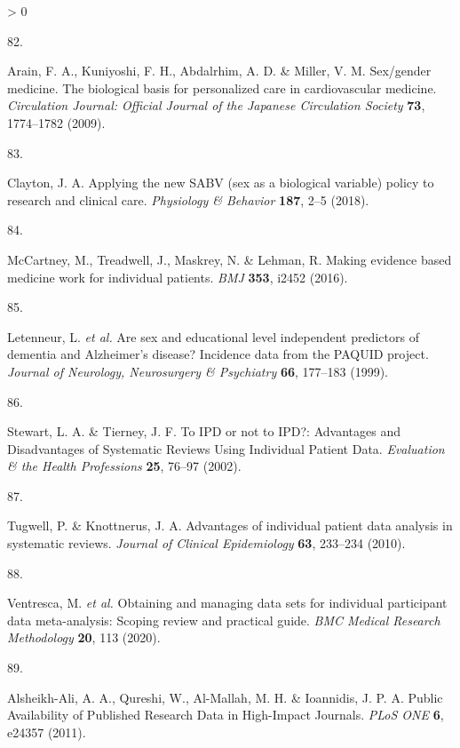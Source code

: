 \documentclass[a4paper, twoside]{templates/ociamthesis}
\newlength{\cslhangindent}
\newlength{\csllabelwidth}
\newenvironment{CSLReferences}[3] %
 {%
  \setlength{\parindent}{0pt}
  \ifodd #1 \everypar{\setlength{\hangindent}{\cslhangindent}}\ignorespaces\fi
  \ifnum #2 > 0
  \setlength{\parskip}{#2\baselineskip}
  \fi
 }%
 {}
\newcommand{\CSLLeftMargin}[1]{\parbox[t]{\maxof{\widthof{#1}}{\csllabelwidth}}{#1}}
\newcommand{\CSLRightInline}[1]{\parbox[t]{\linewidth - \csllabelwidth}{#1}}
\begin{document}
\begin{CSLReferences}{0}{0}
\leavevmode\hypertarget{ref-arain2009}{}%
\CSLLeftMargin{82. }
\CSLRightInline{Arain, F. A., Kuniyoshi, F. H., Abdalrhim, A. D. \& Miller, V. M. Sex/gender medicine. {The} biological basis for personalized care in cardiovascular medicine. \emph{Circulation Journal: Official Journal of the Japanese Circulation Society} \textbf{73}, 1774--1782 (2009).}

\leavevmode\hypertarget{ref-clayton2018}{}%
\CSLLeftMargin{83. }
\CSLRightInline{Clayton, J. A. Applying the new {SABV} (sex as a biological variable) policy to research and clinical care. \emph{Physiology \& Behavior} \textbf{187}, 2--5 (2018).}

\leavevmode\hypertarget{ref-mccartney2016}{}%
\CSLLeftMargin{84. }
\CSLRightInline{McCartney, M., Treadwell, J., Maskrey, N. \& Lehman, R. Making evidence based medicine work for individual patients. \emph{BMJ} \textbf{353}, i2452 (2016).}

\leavevmode\hypertarget{ref-letenneur1999}{}%
\CSLLeftMargin{85. }
\CSLRightInline{Letenneur, L. \emph{et al.} Are sex and educational level independent predictors of dementia and {Alzheimer}'s disease? {Incidence} data from the {PAQUID} project. \emph{Journal of Neurology, Neurosurgery \& Psychiatry} \textbf{66}, 177--183 (1999).}

\leavevmode\hypertarget{ref-stewart2002}{}%
\CSLLeftMargin{86. }
\CSLRightInline{Stewart, L. A. \& Tierney, J. F. To {IPD} or not to {IPD}?: {Advantages} and {Disadvantages} of {Systematic Reviews Using Individual Patient Data}. \emph{Evaluation \& the Health Professions} \textbf{25}, 76--97 (2002).}

\leavevmode\hypertarget{ref-tugwell2010}{}%
\CSLLeftMargin{87. }
\CSLRightInline{Tugwell, P. \& Knottnerus, J. A. Advantages of individual patient data analysis in systematic reviews. \emph{Journal of Clinical Epidemiology} \textbf{63}, 233--234 (2010).}

\leavevmode\hypertarget{ref-ventresca2020}{}%
\CSLLeftMargin{88. }
\CSLRightInline{Ventresca, M. \emph{et al.} Obtaining and managing data sets for individual participant data meta-analysis: Scoping review and practical guide. \emph{BMC Medical Research Methodology} \textbf{20}, 113 (2020).}

\leavevmode\hypertarget{ref-alsheikh-ali2011}{}%
\CSLLeftMargin{89. }
\CSLRightInline{Alsheikh-Ali, A. A., Qureshi, W., Al-Mallah, M. H. \& Ioannidis, J. P. A. Public {Availability} of {Published Research Data} in {High}-{Impact Journals}. \emph{PLoS ONE} \textbf{6}, e24357 (2011).}


\end{CSLReferences}
\end{document}
